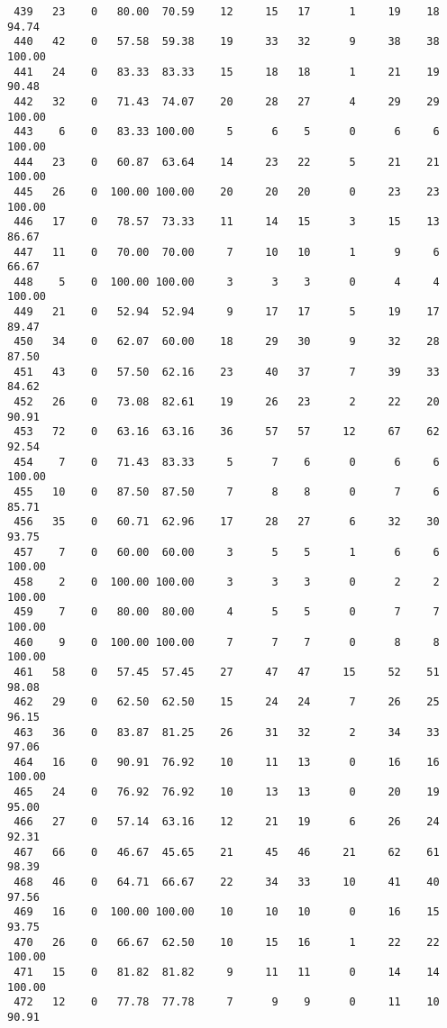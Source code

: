 \begin{verbatim}
 439   23    0   80.00  70.59    12     15   17      1     19    18    94.74
 440   42    0   57.58  59.38    19     33   32      9     38    38   100.00
 441   24    0   83.33  83.33    15     18   18      1     21    19    90.48
 442   32    0   71.43  74.07    20     28   27      4     29    29   100.00
 443    6    0   83.33 100.00     5      6    5      0      6     6   100.00
 444   23    0   60.87  63.64    14     23   22      5     21    21   100.00
 445   26    0  100.00 100.00    20     20   20      0     23    23   100.00
 446   17    0   78.57  73.33    11     14   15      3     15    13    86.67
 447   11    0   70.00  70.00     7     10   10      1      9     6    66.67
 448    5    0  100.00 100.00     3      3    3      0      4     4   100.00
 449   21    0   52.94  52.94     9     17   17      5     19    17    89.47
 450   34    0   62.07  60.00    18     29   30      9     32    28    87.50
 451   43    0   57.50  62.16    23     40   37      7     39    33    84.62
 452   26    0   73.08  82.61    19     26   23      2     22    20    90.91
 453   72    0   63.16  63.16    36     57   57     12     67    62    92.54
 454    7    0   71.43  83.33     5      7    6      0      6     6   100.00
 455   10    0   87.50  87.50     7      8    8      0      7     6    85.71
 456   35    0   60.71  62.96    17     28   27      6     32    30    93.75
 457    7    0   60.00  60.00     3      5    5      1      6     6   100.00
 458    2    0  100.00 100.00     3      3    3      0      2     2   100.00
 459    7    0   80.00  80.00     4      5    5      0      7     7   100.00
 460    9    0  100.00 100.00     7      7    7      0      8     8   100.00
 461   58    0   57.45  57.45    27     47   47     15     52    51    98.08
 462   29    0   62.50  62.50    15     24   24      7     26    25    96.15
 463   36    0   83.87  81.25    26     31   32      2     34    33    97.06
 464   16    0   90.91  76.92    10     11   13      0     16    16   100.00
 465   24    0   76.92  76.92    10     13   13      0     20    19    95.00
 466   27    0   57.14  63.16    12     21   19      6     26    24    92.31
 467   66    0   46.67  45.65    21     45   46     21     62    61    98.39
 468   46    0   64.71  66.67    22     34   33     10     41    40    97.56
 469   16    0  100.00 100.00    10     10   10      0     16    15    93.75
 470   26    0   66.67  62.50    10     15   16      1     22    22   100.00
 471   15    0   81.82  81.82     9     11   11      0     14    14   100.00
 472   12    0   77.78  77.78     7      9    9      0     11    10    90.91

\end{verbatim}
